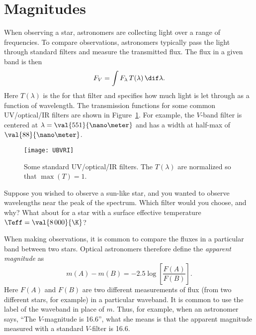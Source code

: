 \section{Magnitudes}
\label{s.magnitudes}

When observing a star, astronomers are collecting light over a range of frequencies. To compare observations, astronomers typically pass the light through standard filters and measure the transmitted flux. The flux in a given band is then
\[
	F_{V} = \int F_{\lambda} \, T(\lambda)\,\dif\lambda.
\]
Here $T(\lambda)$ is the  for that filter and specifies how much light is let through as a function of wavelength.  The transmission functions for some common UV/optical/IR filters are shown in Figure~\ref{f.UBVRI}. For example, the $V$-band filter is centered at $\lambda=\val{551}{\nano\meter}$ and has a width at half-max of $\val{88}{\nano\meter}$. 
\begin{figure}
\texttt{[image: UBVRI]}
\caption[Standard filters]{\label{f.UBVRI} Some standard UV/optical/IR filters. The $T(\lambda)$ are normalized so that $\max(T)=1$.}
\end{figure}

\begin{exercisebox}
Suppose you wished to observe a sun-like star, and you wanted to observe wavelengths near the peak of the spectrum.  Which filter would you choose, and why?  What about for a star with a surface effective temperature $\Teff = \val{8\,000}{\K}$? 
\end{exercisebox}

When making observations, it is common to compare the fluxes in a particular band between two stars. Optical astronomers therefore define the \emph{apparent magnitude} as
\begin{equation}\label{e.apparent-magnitude}
m(A) - m(B) = -2.5\log\left[\frac{F(A)}{F(B)}\right].
\end{equation}
Here $F(A)$ and $F(B)$ are two different measurements of flux (from two different stars, for example) in a particular waveband. It is common to use the label of the waveband in place of $m$. Thus, for example, when an astronomer says, ``The $V$-magnitude is 16.6'', what she means is that the apparent magnitude measured with a standard $V$-filter is 16.6.

